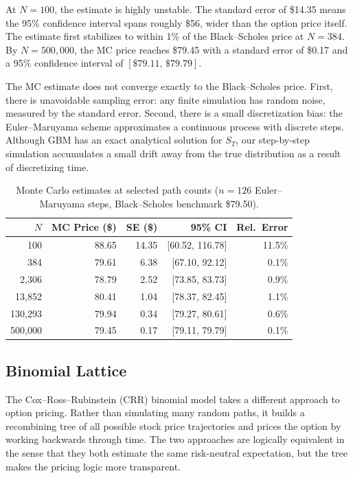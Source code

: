 \documentclass[12pt, a4paper]{article}
\begin{document}
At $N = 100$, the estimate is highly unstable. The standard error of \$14.35 means the 95\% confidence interval spans roughly \$56, wider than the option price itself. The estimate first stabilizes to within 1\% of the Black--Scholes price at $N = 384$. By $N = 500{,}000$, the MC price reaches \$79.45 with a standard error of \$0.17 and a 95\% confidence interval of $[\$79.11,\, \$79.79]$.
 
The MC estimate does not converge exactly to the Black--Scholes price. First, there is unavoidable sampling error: any finite simulation has
random noise, measured by the standard error. Second, there is a small discretization bias: the Euler--Maruyama scheme approximates a continuous
process with discrete steps. Although GBM has an exact analytical solution for $S_T$, our step-by-step simulation accumulates a small drift away from the true distribution as a result of discretizing time. 

\begin{table}[H]
\centering
\caption{Monte Carlo estimates at selected path counts ($n = 126$ Euler--Maruyama steps,
Black--Scholes benchmark \$79.50).}
\label{tab:mc_selected}
\begin{tabular}{rrrrr}
\toprule
$N$ & MC Price (\$) & SE (\$) & 95\% CI & Rel.\ Error \\
\midrule
100     & 88.65 & 14.35 & [60.52, 116.78] & 11.5\% \\
384     & 79.61 &  6.38 & [67.10, 92.12]  &  0.1\% \\
2,306   & 78.79 &  2.52 & [73.85, 83.73]  &  0.9\% \\
13,852  & 80.41 &  1.04 & [78.37, 82.45]  &  1.1\% \\
130,293 & 79.94 &  0.34 & [79.27, 80.61]  &  0.6\% \\
500,000 & 79.45 &  0.17 & [79.11, 79.79]  &  0.1\% \\
\bottomrule
\end{tabular}
\end{table}
 
\subsection{Binomial Lattice}
\label{sec:q2_binom}
 
The Cox--Ross--Rubinstein (CRR) binomial model takes a different approach to option pricing. Rather than simulating many random paths, it builds a recombining tree of all possible stock price trajectories and prices the option by working backwards through time. The two approaches are logically equivalent in the sense that they both estimate the same risk-neutral expectation, but the tree makes the pricing logic more transparent.
 
\end{document}
